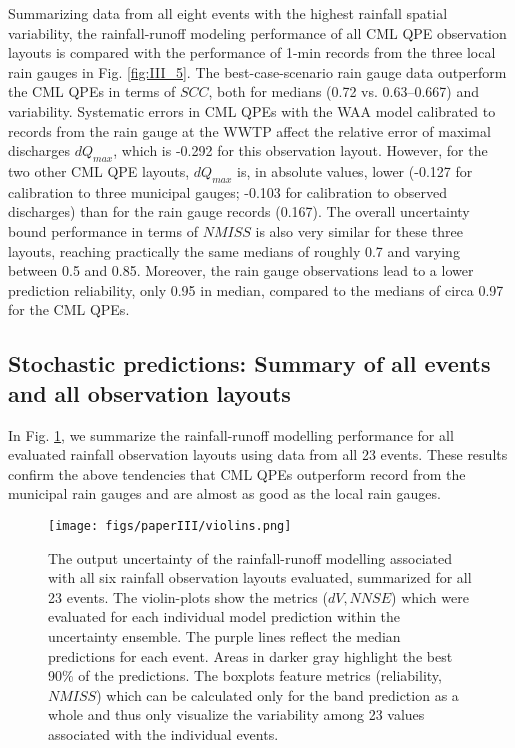 \documentclass{ctuthesis}\usepackage[]{graphicx}\usepackage[]{color}
\begin{document}
Summarizing data from all eight events with the highest rainfall spatial variability, the rainfall-runoff modeling performance of all CML QPE observation layouts is compared with the performance of 1-min records from the three local rain gauges in Fig. \ref{fig:III_5}. The best-case-scenario rain gauge data outperform the CML QPEs in terms of $S\!C\!C$, both for medians (0.72 vs. 0.63--0.667) and variability. Systematic errors in CML QPEs with the WAA model calibrated to records from the rain gauge at the WWTP affect the relative error of maximal discharges $dQ_{max}$, which is -0.292 for this observation layout. However, for the  two other CML QPE layouts, $dQ_{max}$ is, in absolute values, lower (-0.127 for calibration to three municipal gauges; -0.103 for calibration to observed discharges) than for the rain gauge records (0.167). The overall uncertainty bound performance in terms of $N\!M\!I\!S\!S$ is also very similar for these three layouts, reaching practically the same medians of roughly 0.7 and varying between 0.5 and 0.85. Moreover, the rain gauge observations lead to a lower prediction reliability, only 0.95 in median, compared to the medians of circa 0.97 for the CML QPEs.




\subsection{Stochastic predictions: Summary of all events and all observation layouts} \label{Summary}

In Fig. \ref{fig:III_4}, we summarize the rainfall-runoff modelling performance for all evaluated rainfall observation layouts using data from all 23 events. These results confirm the above tendencies that CML QPEs outperform record from the municipal rain gauges and are almost as good as the local rain gauges. 



\begin{figure}[p]
\begin{center}
\texttt{[image: figs/paperIII/violins.png]}
\caption{The output uncertainty of the rainfall-runoff modelling associated with all six rainfall observation layouts evaluated, summarized for all 23 events. The violin-plots show the metrics ($dV, N\!N\!S\!E$) which were evaluated for each individual model prediction within the uncertainty ensemble. The purple lines reflect the median predictions for each event. Areas in darker gray highlight the best 90\% of the predictions. The boxplots feature metrics (reliability, $N\!M\!I\!S\!S$) which can be calculated only for the band prediction as a whole and thus only visualize the variability among 23 values associated with the individual events.} 
\label{fig:III_4}
\end{center}
\end{figure}
\end{document}
